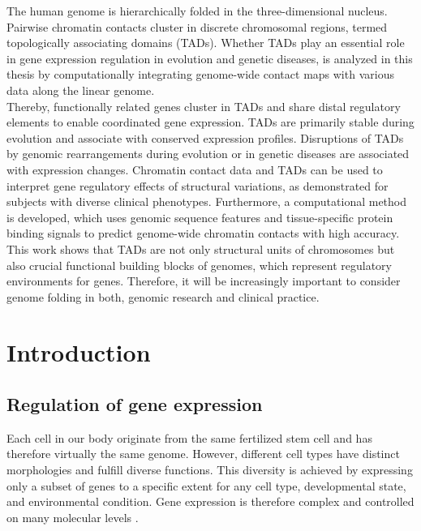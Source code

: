 \documentclass[a4paper,twoside=true,openright,parskip=full,chapterprefix=true,11pt,headings=normal,bibliography=totoc,listof=totoc,titlepage=on,captions=tableabove,draft=false]{scrreprt}
\theoremstyle{definition}
\theoremstyle{definition}
\theoremstyle{definition}
\theoremstyle{remark}
\begin{document}
The human genome is hierarchically folded in the three-dimensional
nucleus. Pairwise chromatin contacts cluster in discrete chromosomal
regions, termed topologically associating domains (TADs). Whether TADs
play an essential role in gene expression regulation in evolution and
genetic diseases, is analyzed in this thesis by computationally
integrating genome-wide contact maps with various data along the linear
genome.\\
Thereby, functionally related genes cluster in TADs and share distal
regulatory elements to enable coordinated gene expression. TADs are
primarily stable during evolution and associate with conserved
expression profiles. Disruptions of TADs by genomic rearrangements
during evolution or in genetic diseases are associated with expression
changes. Chromatin contact data and TADs can be used to interpret gene
regulatory effects of structural variations, as demonstrated for
subjects with diverse clinical phenotypes. Furthermore, a computational
method is developed, which uses genomic sequence features and
tissue-specific protein binding signals to predict genome-wide chromatin
contacts with high accuracy.\\
This work shows that TADs are not only structural units of chromosomes
but also crucial functional building blocks of genomes, which represent
regulatory environments for genes. Therefore, it will be increasingly
important to consider genome folding in both, genomic research and
clinical practice.

\hypertarget{intro}{%
\chapter{Introduction}\label{intro}}

\hypertarget{regulation-of-expression}{%
\section{Regulation of gene expression}\label{regulation-of-expression}}

Each cell in our body originate from the same fertilized stem cell and
has therefore virtually the same genome. However, different cell types
have distinct morphologies and fulfill diverse functions. This diversity
is achieved by expressing only a subset of genes to a specific extent
for any cell type, developmental state, and environmental condition.
Gene expression is therefore complex and controlled on many molecular
levels \citep{Lelli2012}.
\end{document}
